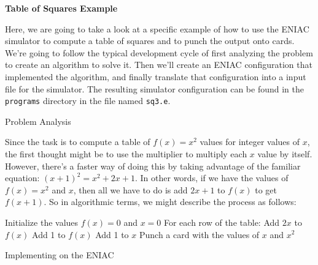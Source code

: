 
\centerline{\bf Table of Squares Example}

Here, we are going to take a look at a specific example of how to use
the ENIAC simulator to compute a table of squares and to punch the
output onto cards.
We're going to follow the typical development cycle of first analyzing
the problem to create an algorithm to solve it.
Then we'll create an ENIAC configuration that implemented the
algorithm, and finally translate that configuration into a input
file for the simulator.
The resulting simulator configuration can be found in the {\tt programs}
directory in the file named {\tt sq3.e}.

\beginsection
Problem Analysis

Since the task is to compute a table of $f(x)=x^2$ values for integer values
of $x$, the first thought might be to use the multiplier to multiply
each $x$ value by itself.
However, there's a faster way of doing this by taking advantage of
the familiar equation: $(x+1)^2=x^2+2x+1$.
In other words, if we have the values of $f(x)=x^2$ and $x$, then
all we have to do is add $2x + 1$ to $f(x)$ to get $f(x+1)$.
So in algorithmic terms, we might describe the process as follows:
\medskip
{\obeylines
Initialize the values $f(x)=0$ and $x=0$
For each row of the table:
\quad Add $2x$ to $f(x)$
\quad Add 1 to $f(x)$
\quad Add 1 to $x$
\quad Punch a card with the values of $x$ and $x^2$

}

\beginsection
Implementing on the ENIAC

